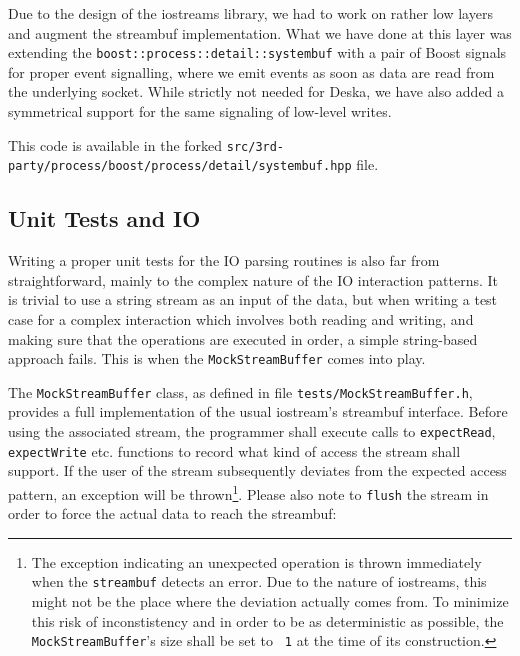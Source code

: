 \documentclass[deska]{subfiles}
\begin{document}
Due to the design of the iostreams library, we had to work on rather low layers and augment the streambuf
implementation.  What we have done at this layer was extending the {\tt boost::process::detail::systembuf} with a pair
of Boost signals for proper event signalling, where we emit events as soon as data are read from the underlying socket.
While strictly not needed for Deska, we have also added a symmetrical support for the same signaling of low-level
writes.

This code is available in the forked {\tt src/3rd-party/process/boost/process/detail/systembuf.hpp} file.

\subsection{Unit Tests and IO}

Writing a proper unit tests for the IO parsing routines is also far from straightforward, mainly to the complex nature
of the IO interaction patterns.  It is trivial to use a string stream as an input of the data, but when writing a test
case for a complex interaction which involves both reading and writing, and making sure that the operations are executed
in order, a simple string-based approach fails.  This is when the {\tt MockStreamBuffer} comes into play.

The {\tt MockStreamBuffer} class, as defined in file {\tt tests/MockStreamBuffer.h}, provides a full implementation of
the usual iostream's streambuf interface.  Before using the associated stream, the programmer shall execute calls to
{\tt expectRead}, {\tt expectWrite} etc. functions to record what kind of access the stream shall support.  If the user
of the stream subsequently deviates from the expected access pattern, an exception will be thrown\footnote{The exception
indicating an unexpected operation is thrown immediately when the {\tt streambuf} detects an error.  Due to the nature
of iostreams, this might not be the place where the deviation actually comes from.  To minimize this risk of
inconstistency and in order to be as deterministic as possible, the {\tt MockStreamBuffer}'s size shall be set to {\tt
1} at the time of its construction.}.  Please also note to {\tt flush} the stream in order to force the actual data to
reach the streambuf:
\end{document}

